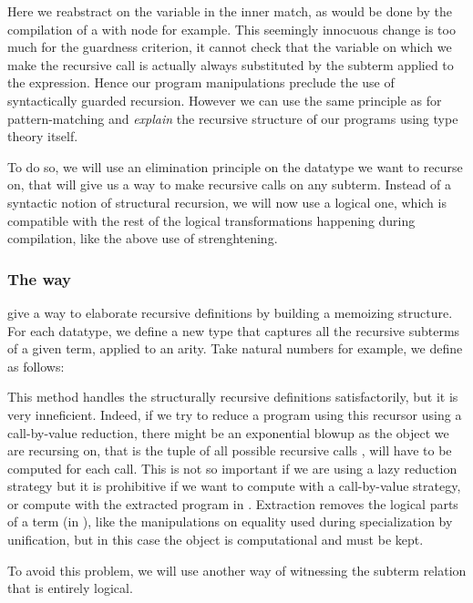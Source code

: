 Here we reabstract on the  variable in the inner match, as would
be done by the compilation of a with node for example. This seemingly 
innocuous change is too much for the guardness criterion, it cannot
check that the  variable on which we make the recursive call
is actually always substituted by the subterm  applied to
the  expression. Hence our program manipulations preclude
the use of syntactically guarded recursion. However we 
can use the same principle as for pattern-matching and 
\emph{explain} the recursive structure of our programs using type theory
itself. 

To do so, we will use an elimination principle on the datatype we want
to recurse on, that will give us a way to make recursive calls on any
subterm. Instead of a syntactic notion of structural recursion, we will now use a
logical one, which is compatible with the rest of the logical
transformations happening during compilation, like the above use of
strenghtening.

\subsubsection{The \Below way}

\citet{DBLP:conf/birthday/GoguenMM06} give a way to
elaborate recursive definitions by building a memoizing structure. 
For each datatype, we define a new type  that captures all
the recursive subterms of a given term, applied to an arity. 
Take natural numbers for example, we define  as follows:



This method handles the structurally recursive definitions
satisfactorily, but it is very inneficient. Indeed, if we try to reduce 
a program using this recursor using a call-by-value reduction,
there might be an exponential blowup as 
the object we are recursing on, that is the tuple of all possible
recursive calls , will have to be computed for each call. This is not 
so important if we are using a lazy reduction strategy but it is
prohibitive if we want to compute with a call-by-value strategy,
or compute with the extracted program in \ML. Extraction removes the 
logical parts of a term (in \Prop), like the manipulations on equality
used during specialization by unification, but in this case the
 object is computational and must be kept.

To avoid this problem, we will use another way of witnessing the subterm
relation that is entirely logical.


